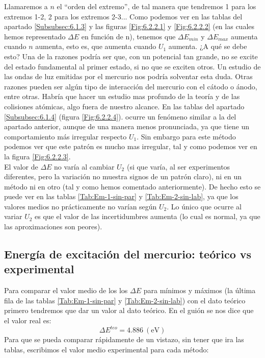 \documentclass[12pt,a4paper]{article}
\numberwithin{equation}{section}
\numberwithin{figure}{section}
\begin{document}
Llamaremos a $n$ el ``orden del extremo'', de tal manera que tendremos 1 para los extremos 1-2, 2 para los extremos 2-3... Como podemos ver en las tablas del apartado \ref{Subsubsec:6.1.3} y las figuras \ref{Fig:6.2.2.1} y \ref{Fig:6.2.2.2} (en las cuales hemos representado $\Delta E$ en función de n), tenemos que $\Delta E_{min}$ y $\Delta E_{max}$ aumenta cuando $n$ aumenta, esto es, que aumenta cuando $U_1$ aumenta. ¿A qué se debe esto?  Una de la razones podría ser que, con un potencial tan grande, no se excite del estado fundamental al primer estado, si no que se exciten otros. Un estudio de las ondas de luz emitidas por el mercurio nos podría solventar esta duda. Otras razones pueden ser algún tipo de interacción del mercurio con el cátodo o ánodo, entre otras. Habría que hacer un estudio mas profundo de la teoría y de las colisiones atómicas, algo fuera de nuestro alcance. En las tablas del apartado \ref{Subsubsec:6.1.4} (figura \ref{Fig:6.2.2.4}). ocurre un fenómeno similar a la del apartado anterior, aunque de una manera menos pronunciada, ya que tiene un comportamiento más irregular respecto $U_1$. Sin embargo para este método podemos ver que este patrón es mucho mas irregular, tal y como podemos ver en la figura \ref{Fig:6.2.2.3}. \\

El valor de $\Delta E$ no varía al cambiar $U_2$ (si que varía, al ser experimentos diferentes, pero la variación no muestra signos de un patrón claro), ni en un método ni en otro (tal y como hemos comentado anteriormente). De hecho esto se puede ver en las tablas \ref{Tab:Em-1-sin-par} y \ref{Tab:Em-2-sin-lab}, ya que los valores medios no prácticamente no varían según $U_2$. Lo único que ocurre al variar $U_2$ es que el valor de las incertidumbres aumenta (lo cual es normal, ya que las aproximaciones son peores). 

\subsection{Energía de excitación del mercurio: teórico vs experimental}

Para comparar el valor medio de los los $\Delta E$ para mínimos y máximos (la última fila de las tablas \ref{Tab:Em-1-sin-par} y \ref{Tab:Em-2-sin-lab}) con el dato teórico primero tendremos que dar un valor al dato teórico. En el guión se nos dice que el valor real es: \\

\begin{equation}
\Delta E^{teo} = 4.886 \ (\mathrm{eV})
\end{equation}
Para que se pueda comparar rápidamente de un vistazo, sin tener que ira las tablas, escribimos el valor medio experimental para cada método: 
\end{document}
